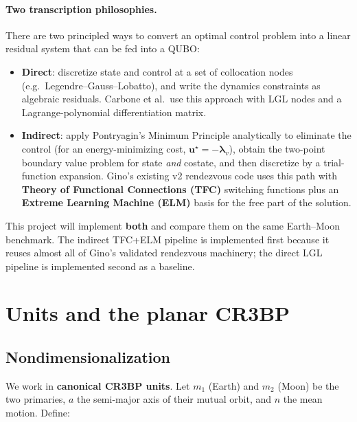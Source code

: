 \documentclass[8pt,a4paper]{article}
\newcommand{\bvec}[1]{\bm{#1}}
\newcommand{\uvec}{\bvec{u}}
\newcommand{\lamv}{\bvec{\lambda}_v}
\theoremstyle{definition}
\theoremstyle{remark}
\begin{document}
\paragraph{Two transcription philosophies.}
There are two principled ways to convert an optimal control problem
into a linear residual system that can be fed into a QUBO:

\begin{itemize}[leftmargin=1.5em, itemsep=2pt]
  \item \textbf{Direct}: discretize state and control at a set of
    collocation nodes (e.g.\ Legendre--Gauss--Lobatto), and write the
    dynamics constraints as algebraic residuals. Carbone et al.\ use
    this approach with LGL nodes and a Lagrange-polynomial
    differentiation matrix.
  \item \textbf{Indirect}: apply Pontryagin's Minimum Principle
    analytically to eliminate the control (for an energy-minimizing
    cost, $\uvec^\star = -\lamv$), obtain the two-point boundary value
    problem for state \emph{and} costate, and then discretize by a
    trial-function expansion. Gino's existing v2 rendezvous code uses
    this path with \textbf{Theory of Functional Connections (TFC)}
    switching functions plus an \textbf{Extreme Learning Machine
    (ELM)} basis for the free part of the solution.
\end{itemize}

This project will implement \textbf{both} and compare them on the
same Earth--Moon benchmark. The indirect TFC+ELM pipeline is
implemented first because it reuses almost all of Gino's validated
rendezvous machinery; the direct LGL pipeline is implemented second
as a baseline.


\section{Units and the planar CR3BP}

\subsection{Nondimensionalization}

We work in \textbf{canonical CR3BP units}. Let $m_1$ (Earth) and
$m_2$ (Moon) be the two primaries, $a$ the semi-major axis of their
mutual orbit, and $n$ the mean motion. Define:
\end{document}
